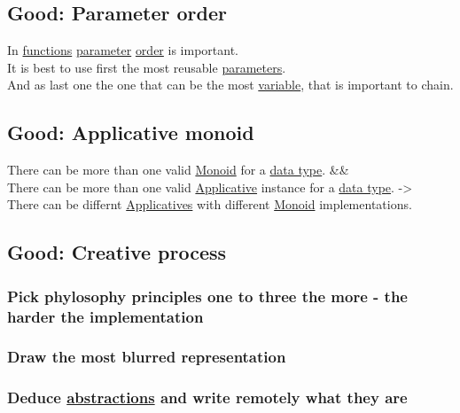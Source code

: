 \documentclass[11pt]{article}
\begin{document}
\subsection{\label{org8fd378e}Good: Parameter order}
\label{sec:org2c0c817}
In \hyperref[org66c5288]{functions} \hyperref[org45d4a16]{parameter} \hyperref[org8544276]{order} is important.\\
It is best to use first the most reusable \hyperref[orgbeb3b81]{parameters}.\\
And as last one the one that can be the most \hyperref[org301bab5]{variable}, that is important to chain.\\

\subsection{\label{orgde1b493}Good: Applicative monoid}
\label{sec:org6102178}
There can be more than one valid \hyperref[org8ff50ea]{Monoid} for a \hyperref[org965cde3]{data type}. \&\&\\
There can be more than one valid \hyperref[org24a6930]{Applicative} instance for a \hyperref[org965cde3]{data type}. ->\\
There can be differnt \hyperref[org49971fd]{Applicatives} with different \hyperref[org8ff50ea]{Monoid} implementations.\\

\subsection{\label{org1c0fb30}Good: Creative process}
\label{sec:org77f21dc}
\subsubsection{Pick phylosophy principles one to three the more - the harder the implementation}
\label{sec:org05d66a1}

\subsubsection{Draw the most blurred representation}
\label{sec:org52c4640}

\subsubsection{Deduce \hyperref[orgabcd7a1]{abstractions} and write remotely what they are}
\label{sec:orgd6838fb}
\end{document}
